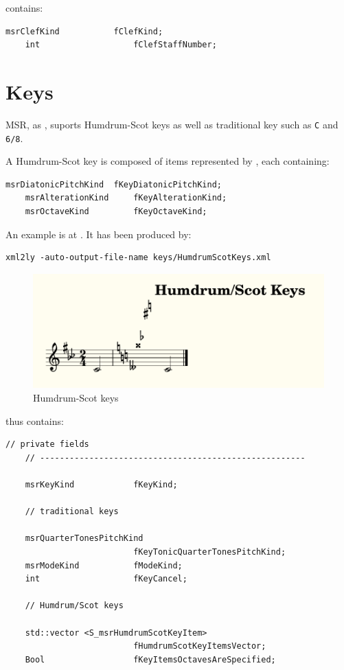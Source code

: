  contains:
\begin{lstlisting}[language=CPlusPlus]
    msrClefKind           fClefKind;
    int                   fClefStaffNumber;
\end{lstlisting}


\section{Keys}\label{Keys}

MSR, as \mxml, suports Humdrum-Scot keys as well as traditional key such as {\tt C} and {\tt 6/8}.

A Humdrum-Scot key is composed of items represented by , each containing:
\begin{lstlisting}[language=CPlusPlus]
    msrDiatonicPitchKind  fKeyDiatonicPitchKind;
    msrAlterationKind     fKeyAlterationKind;
    msrOctaveKind         fKeyOctaveKind;
\end{lstlisting}

An example is at . It has been produced by:
\begin{lstlisting}[language=Terminal]
xml2ly -auto-output-file-name keys/HumdrumScotKeys.xml
\end{lstlisting}

\begin{figure}[htbp]
\begin{center}
\includegraphics{../mfgraphics/mfgraphicsHumdrumScotKeys.png}

\caption{Humdrum-Scot keys}
\label{Humdrum-Scot keys}
\end{center}
\end{figure}

 thus contains:
\begin{lstlisting}[language=CPlusPlus]
    // private fields
    // ------------------------------------------------------

    msrKeyKind            fKeyKind;

    // traditional keys

    msrQuarterTonesPitchKind
                          fKeyTonicQuarterTonesPitchKind;
    msrModeKind           fModeKind;
    int                   fKeyCancel;

    // Humdrum/Scot keys

    std::vector <S_msrHumdrumScotKeyItem>
                          fHumdrumScotKeyItemsVector;
    Bool                  fKeyItemsOctavesAreSpecified;
\end{lstlisting}


